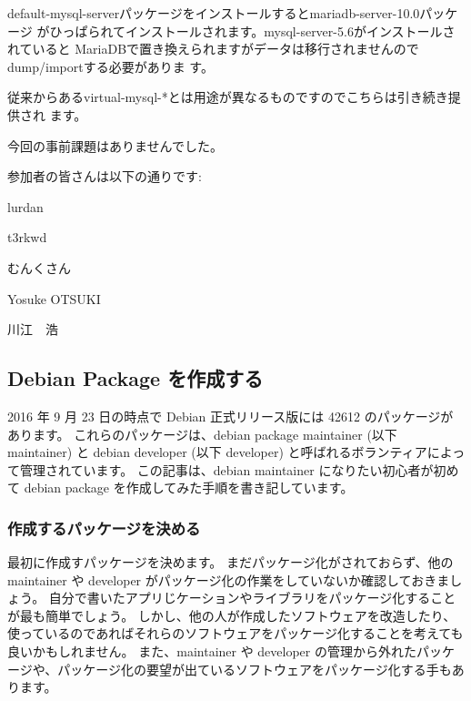 \documentclass[mingoth,a4paper]{jsarticle}
\begin{document}
default-mysql-serverパッケージをインストールするとmariadb-server-10.0パッケージ
がひっぱられてインストールされます。mysql-server-5.6がインストールされていると
MariaDBで置き換えられますがデータは移行されませんのでdump/importする必要がありま
す。

従来からあるvirtual-mysql-*とは用途が異なるものですのでこちらは引き続き提供され
ます。



今回の事前課題はありませんでした。

参加者の皆さんは以下の通りです:

\begin{prework}{ lurdan }
\end{prework}

\begin{prework}{ t3rkwd }
\end{prework}

\begin{prework}{ むんくさん }
\end{prework}

\begin{prework}{ Yosuke OTSUKI }
\end{prework}

\begin{prework}{ 川江　浩 }
\end{prework}



\subsection{ Debian Package を作成する }

2016 年 9 月 23 日の時点で Debian 正式リリース版には 42612 のパッケージがあります。
これらのパッケージは、debian package maintainer (以下 maintainer) と debian developer (以下 developer)  と呼ばれるボランティアによって管理されています。
この記事は、debian maintainer になりたい初心者が初めて debian package を作成してみた手順を書き記しています。

\subsubsection{ 作成するパッケージを決める }

最初に作成すパッケージを決めます。
まだパッケージ化がされておらず、他の maintainer や developer がパッケージ化の作業をしていないか確認しておきましょう。
自分で書いたアプリじケーションやライブラリをパッケージ化することが最も簡単でしょう。
しかし、他の人が作成したソフトウェアを改造したり、使っているのであればそれらのソフトウェアをパッケージ化することを考えても良いかもしれません。
また、maintainer や developer の管理から外れたパッケージや、パッケージ化の要望が出ているソフトウェアをパッケージ化する手もあります。
\end{document}
